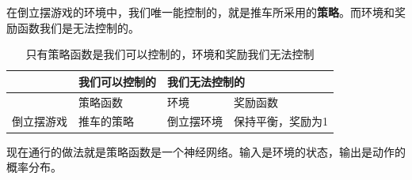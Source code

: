 \documentclass[lang=cn,newtx,10pt,scheme=chinese]{elegantbook}
\begin{document}
在倒立摆游戏的环境中，我们唯一能控制的，就是推车所采用的\textbf{策略}。而环境和奖励函数我们是无法控制的。

\begin{table}[!ht]
\centering
\begin{tabular}{|l|l|ll|}
\hline
      & \textbf{我们可以控制的}             & \multicolumn{2}{l|}{\textbf{我们无法控制的}}                                          \\ \hline
      & \cellcolor[HTML]{96FFFB}策略函数 & \multicolumn{1}{l|}{\cellcolor[HTML]{FCFF2F}环境} & \cellcolor[HTML]{67FD9A}奖励函数 \\ \hline
倒立摆游戏 & 推车的策略                        & \multicolumn{1}{l|}{倒立摆环境}                      & 保持平衡，奖励为1                    \\ \hline
\end{tabular}
\caption{只有策略函数是我们可以控制的，环境和奖励我们无法控制}
\end{table}

现在通行的做法就是策略函数是一个神经网络。输入是环境的状态，输出是动作的概率分布。
\end{document}
